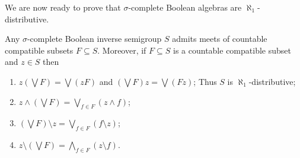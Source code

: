 We are now ready to prove that $\sigma$-complete Boolean algebras are $\aleph_1$-distributive.%

\begin{proposition}\label{propositionsigmadistributivitisigmacomplete}
Any $\sigma$-complete Boolean inverse semigroup $S$ admits meets of countable compatible subsets $F\subseteq S$. Moreover, if $F\subseteq S$ is a countable compatible subset and $z\in S$ then
\begin{enumerate}
\item[(a)] $z\left(\bigvee F\right)=\bigvee(zF)$ and $\left(\bigvee F\right)z=\bigvee(Fz)$; Thus $S$ is $\aleph_1$-distributive;
\item[(b)] $z\land\left(\bigvee F\right)=\bigvee_{f\in F}(z\land f)$;
\item[(c)] $\left(\bigvee F\right)\setminus z=\bigvee_{f\in F}(f\setminus z)$;
\item[(d)] $z\setminus(\bigvee F)=\bigwedge_{f\in F}(z\setminus f)$.
\end{enumerate}
\end{proposition}
